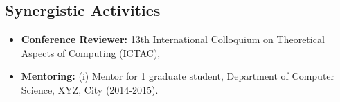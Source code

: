   \subsection*{Synergistic Activities}
  
  \begin{itemize}%
      \item \textbf{Conference Reviewer:}
      13th International Colloquium on Theoretical Aspects of Computing (ICTAC),
      \item \textbf{Mentoring:}
          (i) Mentor for 1 graduate student, Department of Computer Science, XYZ, City (2014-2015).
  
  \end{itemize}
  
